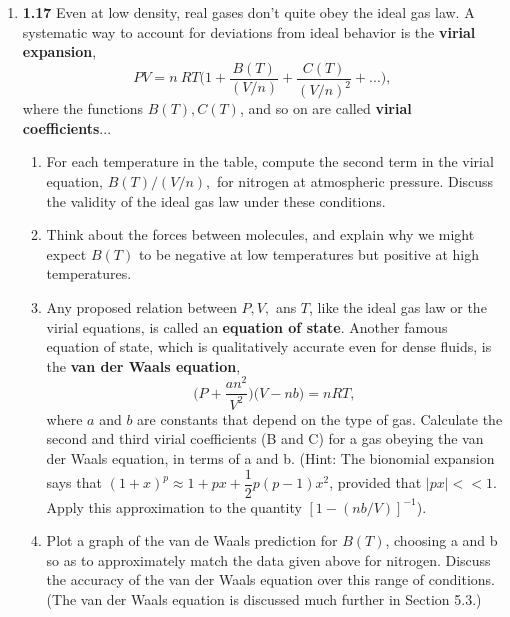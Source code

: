 \documentclass[fleqn]{article}
\begin{document}
\begin{enumerate}
    \item \textbf{1.17} Even at low density, real gases don't quite obey the ideal gas law. A systematic way to account for deviations 
    from ideal behavior is the \textbf{virial expansion},
    $$
      PV=n ~ RT \bigg(1+\dfrac{B(T)}{(V/n)}+\dfrac{C(T)}{(V/n)^2}+...\bigg),
    $$
    where the functions $B(T), C(T)$, and so on are called \textbf{virial coefficients}... 
    \begin{enumerate}
      \item For each temperature in the table, compute the second term in the virial equation, $B(T)/(V/n),$ for nitrogen at atmospheric
      pressure. Discuss the validity of the ideal gas law under these conditions.


      \item Think about the forces between molecules, and explain why we might expect $B(T)$ to be negative at low temperatures but positive 
      at high temperatures.


      \item Any proposed relation between $P, V,$ ans $T$, like the ideal gas law or the virial equations, is called an \textbf{equation of state}.
      Another famous equation of state, which is qualitatively accurate even for dense fluids, is the \textbf{van der Waals equation},
      $$
        \bigg(P+\dfrac{an^2}{V^2}\bigg) \bigg(V-nb\bigg)=nRT,
      $$
      where $a$ and $b$ are constants that depend on the type of gas. Calculate the second and third virial coefficients (B and C) for a gas
      obeying the van der Waals equation, in terms of a and b. (Hint: The bionomial expansion says that 
      $(1+x)^p \approx 1+px+\dfrac{1}{2} p(p-1) x^2$, provided that $|px|<<1$. Apply this approximation to the quantity 
      $\left[1-(nb/V)\right]^{-1}$).


      \item Plot a graph of the van de Waals prediction for $B(T)$, choosing a and b so as to approximately match the data given above for nitrogen. 
      Discuss the accuracy of the van der Waals equation over this range of conditions. (The van der Waals equation is discussed much further 
      in Section 5.3.)


\end{enumerate}
\end{enumerate}
\end{document}
